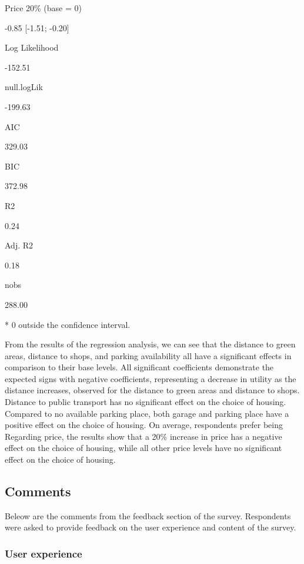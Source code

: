 \documentclass[
]{article}
\begin{document}
Price 20\% (base = 0)

-0.85 {[}-1.51; -0.20{]}

Log Likelihood

-152.51

null.logLik

-199.63

AIC

329.03

BIC

372.98

R2

0.24

Adj. R2

0.18

nobs

288.00

* 0 outside the confidence interval.

From the results of the regression analysis, we can see that the
distance to green areas, distance to shops, and parking availability all
have a significant effects in comparison to their base levels. All
significant coefficients demonstrate the expected signs with negative
coefficients, representing a decrease in utility as the distance
increases, observed for the distance to green areas and distance to
shops. Distance to public transport has no significant effect on the
choice of housing. Compared to no available parking place, both garage
and parking place have a positive effect on the choice of housing. On
average, respondents prefer being Regarding price, the results show that
a 20\% increase in price has a negative effect on the choice of housing,
while all other price levels have no significant effect on the choice of
housing.

\hypertarget{comments}{%
\subsection{Comments}\label{comments}}

Beleow are the comments from the feedback section of the survey.
Respondents were asked to provide feedback on the user experience and
content of the survey.

\hypertarget{user-experience}{%
\subsubsection{User experience}\label{user-experience}}
\end{document}
